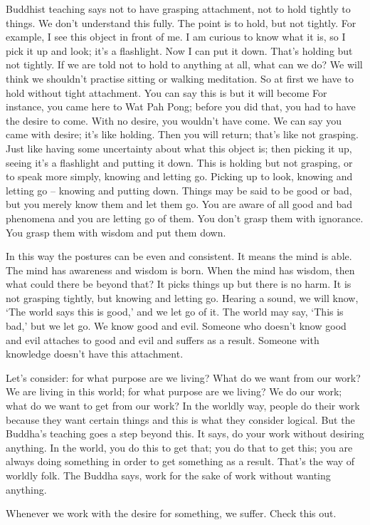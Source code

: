 Buddhist teaching says not to have grasping attachment, not to hold tightly to things. We don't understand this fully. The point is to hold, but not tightly. For example, I see this object in front of me. I am curious to know what it is, so I pick it up and look; it's a flashlight. Now I can put it down. That's holding but not tightly. If we are told not to hold to anything at all, what can we do? We will think we shouldn't practise sitting or walking meditation. So at first we have to hold without tight attachment. You can say this is  but it will become  For instance, you came here to Wat Pah Pong; before you did that, you had to have the desire to come. With no desire, you wouldn't have come. We can say you came with desire; it's like holding. Then you will return; that's like not grasping. Just like having some uncertainty about what this object is; then picking it up, seeing it's a flashlight and putting it down. This is holding but not grasping, or to speak more simply, knowing and letting go. Picking up to look, knowing and letting go -- knowing and putting down. Things may be said to be good or bad, but you merely know them and let them go. You are aware of all good and bad phenomena and you are letting go of them. You don't grasp them with ignorance. You grasp them with wisdom and put them down. 

In this way the postures can be even and consistent. It means the mind is able. The mind has awareness and wisdom is born. When the mind has wisdom, then what could there be beyond that? It picks things up but there is no harm. It is not grasping tightly, but knowing and letting go. Hearing a sound, we will know, `The world says this is good,' and we let go of it. The world may say, `This is bad,' but we let go. We know good and evil. Someone who doesn't know good and evil attaches to good and evil and suffers as a result. Someone with knowledge doesn't have this attachment. 

Let's consider: for what purpose are we living? What do we want from our work? We are living in this world; for what purpose are we living? We do our work; what do we want to get from our work? In the worldly way, people do their work because they want certain things and this is what they consider logical. But the Buddha's teaching goes a step beyond this. It says, do your work without desiring anything. In the world, you do this to get that; you do that to get this; you are always doing something in order to get something as a result. That's the way of worldly folk. The Buddha says, work for the sake of work without wanting anything. 

Whenever we work with the desire for something, we suffer. Check this out. 
